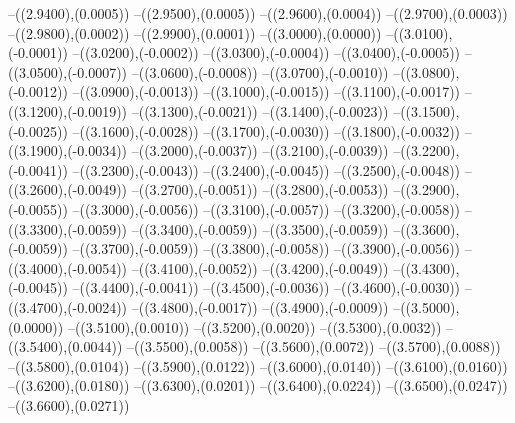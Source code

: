 {	--({\sx*(2.9400)},{\sy*(0.0005)})
	--({\sx*(2.9500)},{\sy*(0.0005)})
	--({\sx*(2.9600)},{\sy*(0.0004)})
	--({\sx*(2.9700)},{\sy*(0.0003)})
	--({\sx*(2.9800)},{\sy*(0.0002)})
	--({\sx*(2.9900)},{\sy*(0.0001)})
	--({\sx*(3.0000)},{\sy*(0.0000)})
	--({\sx*(3.0100)},{\sy*(-0.0001)})
	--({\sx*(3.0200)},{\sy*(-0.0002)})
	--({\sx*(3.0300)},{\sy*(-0.0004)})
	--({\sx*(3.0400)},{\sy*(-0.0005)})
	--({\sx*(3.0500)},{\sy*(-0.0007)})
	--({\sx*(3.0600)},{\sy*(-0.0008)})
	--({\sx*(3.0700)},{\sy*(-0.0010)})
	--({\sx*(3.0800)},{\sy*(-0.0012)})
	--({\sx*(3.0900)},{\sy*(-0.0013)})
	--({\sx*(3.1000)},{\sy*(-0.0015)})
	--({\sx*(3.1100)},{\sy*(-0.0017)})
	--({\sx*(3.1200)},{\sy*(-0.0019)})
	--({\sx*(3.1300)},{\sy*(-0.0021)})
	--({\sx*(3.1400)},{\sy*(-0.0023)})
	--({\sx*(3.1500)},{\sy*(-0.0025)})
	--({\sx*(3.1600)},{\sy*(-0.0028)})
	--({\sx*(3.1700)},{\sy*(-0.0030)})
	--({\sx*(3.1800)},{\sy*(-0.0032)})
	--({\sx*(3.1900)},{\sy*(-0.0034)})
	--({\sx*(3.2000)},{\sy*(-0.0037)})
	--({\sx*(3.2100)},{\sy*(-0.0039)})
	--({\sx*(3.2200)},{\sy*(-0.0041)})
	--({\sx*(3.2300)},{\sy*(-0.0043)})
	--({\sx*(3.2400)},{\sy*(-0.0045)})
	--({\sx*(3.2500)},{\sy*(-0.0048)})
	--({\sx*(3.2600)},{\sy*(-0.0049)})
	--({\sx*(3.2700)},{\sy*(-0.0051)})
	--({\sx*(3.2800)},{\sy*(-0.0053)})
	--({\sx*(3.2900)},{\sy*(-0.0055)})
	--({\sx*(3.3000)},{\sy*(-0.0056)})
	--({\sx*(3.3100)},{\sy*(-0.0057)})
	--({\sx*(3.3200)},{\sy*(-0.0058)})
	--({\sx*(3.3300)},{\sy*(-0.0059)})
	--({\sx*(3.3400)},{\sy*(-0.0059)})
	--({\sx*(3.3500)},{\sy*(-0.0059)})
	--({\sx*(3.3600)},{\sy*(-0.0059)})
	--({\sx*(3.3700)},{\sy*(-0.0059)})
	--({\sx*(3.3800)},{\sy*(-0.0058)})
	--({\sx*(3.3900)},{\sy*(-0.0056)})
	--({\sx*(3.4000)},{\sy*(-0.0054)})
	--({\sx*(3.4100)},{\sy*(-0.0052)})
	--({\sx*(3.4200)},{\sy*(-0.0049)})
	--({\sx*(3.4300)},{\sy*(-0.0045)})
	--({\sx*(3.4400)},{\sy*(-0.0041)})
	--({\sx*(3.4500)},{\sy*(-0.0036)})
	--({\sx*(3.4600)},{\sy*(-0.0030)})
	--({\sx*(3.4700)},{\sy*(-0.0024)})
	--({\sx*(3.4800)},{\sy*(-0.0017)})
	--({\sx*(3.4900)},{\sy*(-0.0009)})
	--({\sx*(3.5000)},{\sy*(0.0000)})
	--({\sx*(3.5100)},{\sy*(0.0010)})
	--({\sx*(3.5200)},{\sy*(0.0020)})
	--({\sx*(3.5300)},{\sy*(0.0032)})
	--({\sx*(3.5400)},{\sy*(0.0044)})
	--({\sx*(3.5500)},{\sy*(0.0058)})
	--({\sx*(3.5600)},{\sy*(0.0072)})
	--({\sx*(3.5700)},{\sy*(0.0088)})
	--({\sx*(3.5800)},{\sy*(0.0104)})
	--({\sx*(3.5900)},{\sy*(0.0122)})
	--({\sx*(3.6000)},{\sy*(0.0140)})
	--({\sx*(3.6100)},{\sy*(0.0160)})
	--({\sx*(3.6200)},{\sy*(0.0180)})
	--({\sx*(3.6300)},{\sy*(0.0201)})
	--({\sx*(3.6400)},{\sy*(0.0224)})
	--({\sx*(3.6500)},{\sy*(0.0247)})
	--({\sx*(3.6600)},{\sy*(0.0271)})
}
